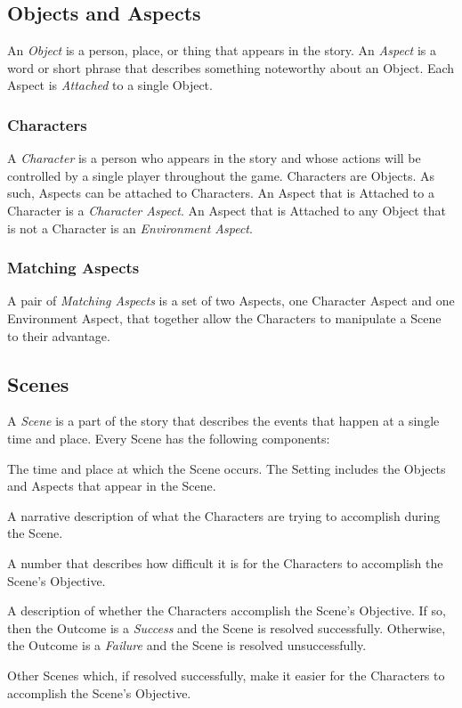 \documentclass[12pt, a5paper, parskip=half-]{scrartcl}
\begin{document}
\newpage

\subsection*{Objects and Aspects}
An \emph{Object} is a person, place, or thing that appears in the story.
An \emph{Aspect} is a word or short phrase that describes something noteworthy about an Object.
Each Aspect is \emph{Attached} to a single Object.

\subsubsection*{Characters}
A \emph{Character} is a person who appears in the story and whose actions will be controlled by a single player throughout the game. Characters are Objects. As such, Aspects can be attached to Characters. An Aspect that is Attached to a Character is a \emph{Character Aspect}.
An Aspect that is Attached to any Object that is not a Character is an \emph{Environment Aspect}.

\subsubsection*{Matching Aspects}
A pair of \emph{Matching Aspects} is a set of two Aspects, one Character Aspect and one Environment Aspect, that together allow the Characters to manipulate a Scene to their advantage.

\newpage

\subsection*{Scenes}
A \emph{Scene} is a part of the story that describes the events that happen at a single time and place.
Every Scene has the following components:
\begin{description}[leftmargin=0pt]
  \item[\emph{Setting}]
  The time and place at which the Scene occurs. The Setting includes the Objects and Aspects that appear in the Scene.
  \item[\emph{Objective}]
    A narrative description of what the Characters are trying to accomplish during the Scene.
  \item[\emph{Difficulty Rating}]
    A number that describes how difficult it is for the Characters to accomplish the Scene's Objective.
  \item[\emph{Outcome}]
    A description of whether the Characters accomplish the Scene's Objective. If so, then the Outcome is a \emph{Success} and the Scene is resolved successfully. Otherwise, the Outcome is a \emph{Failure} and the Scene is resolved unsuccessfully.
  \item[\emph{Precursors}]
    Other Scenes which, if resolved successfully, make it easier for the Characters to accomplish the Scene's Objective.
\end{description}
\end{document}
